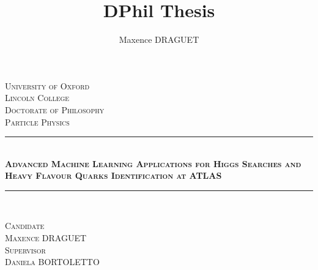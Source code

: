 \documentclass[11pt,a4paper]{report}
\author{Maxence DRAGUET}
\title{DPhil Thesis}
\begin{document}
\begin{titlepage}
\pagecolor{oxfordblue}    

\newcommand{\HRule}{\rule{\linewidth}{0.5mm}}
\center 
\vspace*{2cm}
\textsc{\LARGE \color{white} University of Oxford}\\[0.5cm] 
\textsc{\large \color{white} Lincoln College}\\[1cm]
\textsc{\Large \color{white} Doctorate of Philosophy}\\[0.3cm]
\textsc{\large \color{white} Particle Physics}\\[2cm]

{\color{white} \HRule} \\[0.4cm]
\textsc{\huge \bfseries \color{white} Advanced Machine Learning Applications for Higgs Searches and Heavy Flavour Quarks Identification at ATLAS}\\[0.4cm] 
{\color{white} \HRule}\\[1.5cm]
\color{white}
    \begin{minipage}{0.4\textwidth}
    \begin{center}
    \textsc{Candidate\\[0.2cm]
    \Large Maxence DRAGUET}\\[0.3cm]
    \textsc{Supervisor\\[0.2cm]
    \Large Daniela BORTOLETTO}\\
		
    \end{center}
    \end{minipage}


\end{titlepage}
\end{document}
